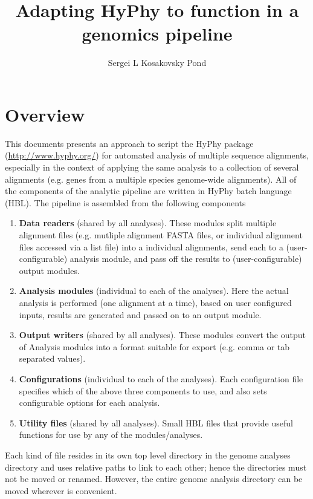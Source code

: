 \documentclass[12pt]{article}
\title{Adapting HyPhy to function in a genomics pipeline}
\author{Sergei L Kosakovsky Pond}
\begin{document}
\maketitle
\section{Overview}
This documents presents an approach to script the HyPhy package (\url {http://www.hyphy.org/}) for automated analysis of multiple sequence alignments, especially in the context of applying the same analysis to a collection of several alignments (e.g. genes from a multiple species genome-wide alignments). All of the components of the analytic pipeline are written in HyPhy batch language (HBL). The pipeline is assembled from the following components
\begin{enumerate}

\item {\bf Data readers} (shared by all analyses). These modules split multiple alignment files (e.g. mutliple alignment FASTA files, or individual alignment files accessed via a list file) into a individual alignments, send each to a (user-configurable) analysis module, and pass off the results to (user-configurable) output modules. 

\item {\bf Analysis modules} (individual to each of the analyses). Here the actual analysis is performed (one alignment at a time), based on user configured inputs, results are generated and passed on to an output module. 

\item {\bf Output writers} (shared by all analyses). These modules convert the output of Analysis modules into a format suitable for export (e.g. comma or tab separated values). 

\item {\bf Configurations} (individual to each of the analyses). Each configuration file specifies which of the above three components to use, and also sets configurable options for each analysis. 

\item {\bf Utility files} (shared by all analyses). Small HBL files that provide useful functions for use by any of the modules/analyses. 

\end{enumerate}

Each kind of file resides in its own top level directory in the genome analyses directory and uses relative paths to link to each other; hence the directories must not be moved or renamed. However, the entire genome analysis directory can be moved wherever is convenient. 
\end{document}
